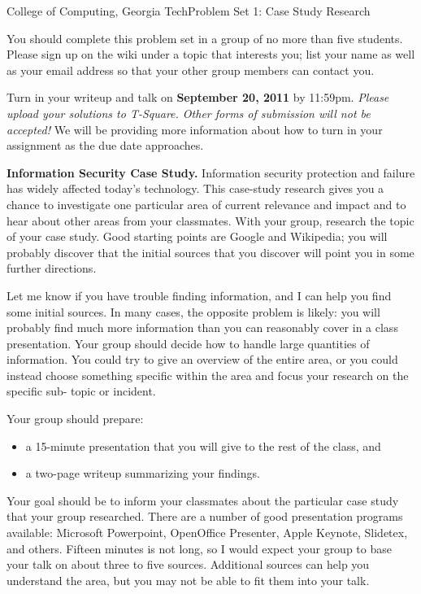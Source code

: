 \documentclass[11pt]{article}
\begin{document}


{College of Computing, Georgia Tech}{Problem Set 1: Case Study Research}


You should complete this problem set in a group of no more than five
students.  Please sign up on the wiki under a topic that interests you;
list your name as well as your email address so that your other group
members can contact you.

Turn in your writeup and talk on {\bf September 20, 2011} by 11:59pm.
{\em Please upload your solutions to T-Square.  Other forms of
  submission will not be accepted!}  We will be providing more
information about how to turn in your assignment as the due date
approaches.


\noindent
{\bf Information Security Case Study.}
Information security protection and failure has widely affected
today’s technology. This case-study research gives you a chance to
investigate one particular area of current relevance and impact and to
hear about other areas from your classmates.  With your group,
research the topic of your case study. Good starting points are Google
and Wikipedia; you will probably discover that the initial sources
that you discover will point you in some further directions. 

Let me know if you have trouble finding information, and I can help
you find some initial sources. In many cases, the opposite problem is
likely: you will probably find much more information than you can
reasonably cover in a class presentation. Your group should decide how
to handle large quantities of information. You could try to give an
overview of the entire area, or you could instead choose something
specific within the area and focus your research on the specific sub-
topic or incident.

Your group should prepare:
\begin{itemize}
\itemsep=-1pt
\item a 15-minute presentation that you will give
to the rest of the class, and
\item a two-page writeup summarizing your findings. 
\end{itemize}
Your goal should be to inform your classmates about the particular case
study that your group researched. There are a number of good
presentation programs available: Microsoft Powerpoint, OpenOffice
Presenter, Apple Keynote, Slidetex, and others. Fifteen minutes is not
long, so I would expect your group to base your talk on about three to
five sources. Additional sources can help you understand the area, but
you may not be able to fit them into your talk.
\end{document}
